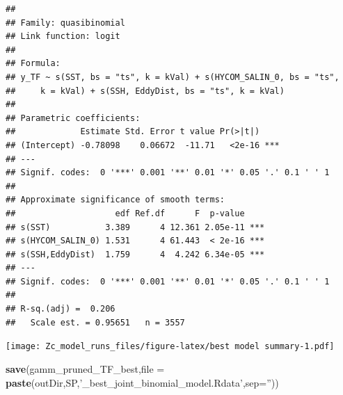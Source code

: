 \documentclass[11pt,]{article}
\newenvironment{Shaded}{\begin{snugshade}}{\end{snugshade}}
\newcommand{\KeywordTok}[1]{\textcolor[rgb]{0.13,0.29,0.53}{\textbf{{#1}}}}
\newcommand{\DataTypeTok}[1]{\textcolor[rgb]{0.13,0.29,0.53}{{#1}}}
\newcommand{\DecValTok}[1]{\textcolor[rgb]{0.00,0.00,0.81}{{#1}}}
\newcommand{\FloatTok}[1]{\textcolor[rgb]{0.00,0.00,0.81}{{#1}}}
\newcommand{\StringTok}[1]{\textcolor[rgb]{0.31,0.60,0.02}{{#1}}}
\newcommand{\NormalTok}[1]{{#1}}
\begin{document}
\begin{Shaded}
\end{Shaded}

\begin{verbatim}
## 
## Family: quasibinomial 
## Link function: logit 
## 
## Formula:
## y_TF ~ s(SST, bs = "ts", k = kVal) + s(HYCOM_SALIN_0, bs = "ts", 
##     k = kVal) + s(SSH, EddyDist, bs = "ts", k = kVal)
## 
## Parametric coefficients:
##             Estimate Std. Error t value Pr(>|t|)    
## (Intercept) -0.78098    0.06672  -11.71   <2e-16 ***
## ---
## Signif. codes:  0 '***' 0.001 '**' 0.01 '*' 0.05 '.' 0.1 ' ' 1
## 
## Approximate significance of smooth terms:
##                    edf Ref.df      F  p-value    
## s(SST)           3.389      4 12.361 2.05e-11 ***
## s(HYCOM_SALIN_0) 1.531      4 61.443  < 2e-16 ***
## s(SSH,EddyDist)  1.759      4  4.242 6.34e-05 ***
## ---
## Signif. codes:  0 '***' 0.001 '**' 0.01 '*' 0.05 '.' 0.1 ' ' 1
## 
## R-sq.(adj) =  0.206   
##   Scale est. = 0.95651   n = 3557
\end{verbatim}

\begin{Shaded}
\end{Shaded}

\texttt{[image: Zc\_model\_runs\_files/figure-latex/best model summary-1.pdf]}

\begin{Shaded}
\begin{Highlighting}[]
\KeywordTok{save}\NormalTok{(gamm_pruned_TF_best,}\DataTypeTok{file =} \KeywordTok{paste}\NormalTok{(outDir,SP,}\StringTok{'_best_joint_binomial_model.Rdata'}\NormalTok{,}\DataTypeTok{sep=}\StringTok{''}\NormalTok{))}
\end{Highlighting}
\end{Shaded}

\begin{Shaded}
\end{Shaded}
\end{document}
